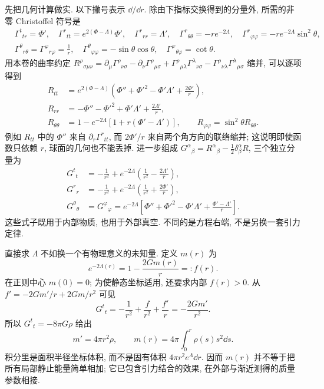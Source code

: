 先把几何计算做实. 以下撇号表示 $\dd/\dd r$. 除由下指标交换得到的分量外, 所需的非零 Christoffel 符号是
\begin{align}
 &\Gamma^t{}_{tr}=\Phi',\quad
 \Gamma^r{}_{tt}=e^{2(\Phi-\Lambda)}\Phi',\quad
 \Gamma^r{}_{rr}=\Lambda',\quad
 \Gamma^r{}_{\theta\theta}=-r e^{-2\Lambda},\quad
 \Gamma^r{}_{\varphi\varphi}=-r e^{-2\Lambda}\sin^2\theta,\nonumber\\
 &\Gamma^\theta{}_{r\theta}=\Gamma^\varphi{}_{r\varphi}=\frac1r,\quad
 \Gamma^\theta{}_{\varphi\varphi}=-\sin\theta\cos\theta,\quad
 \Gamma^\varphi{}_{\theta\varphi}=\cot\theta.
 \label{eq:gr-star-gamma}
\end{align}
用本卷的曲率约定 $R^\rho{}_{\sigma\mu\nu}=\partial_\mu\Gamma^\rho{}_{\nu\sigma}-\partial_\nu\Gamma^\rho{}_{\mu\sigma}+\Gamma^\rho{}_{\mu\lambda}\Gamma^\lambda{}_{\nu\sigma}-\Gamma^\rho{}_{\nu\lambda}\Gamma^\lambda{}_{\mu\sigma}$ 缩并, 可以逐项得到
\begin{align}
 R_{tt}&=e^{2(\Phi-\Lambda)}\left(\Phi''+\Phi'^2-\Phi'\Lambda'+\frac{2\Phi'}r\right),\nonumber\\
 R_{rr}&=-\Phi''-\Phi'^2+\Phi'\Lambda'+\frac{2\Lambda'}r,\nonumber\\
 R_{\theta\theta}&=1-e^{-2\Lambda}\left[1+r(\Phi'-\Lambda')\right],\qquad
 R_{\varphi\varphi}=\sin^2\theta R_{\theta\theta}.
 \label{eq:gr-star-ricci}
\end{align}
例如 $R_{tt}$ 中的 $\Phi''$ 来自 $\partial_r\Gamma^r{}_{tt}$, 而 $2\Phi'/r$ 来自两个角方向的联络缩并; 这说明即使函数只依赖 $r$, 球面的几何也不能丢掉. 进一步组成 $G^\alpha{}_{\beta}=R^\alpha{}_{\beta}-\tfrac12\delta^\alpha_\beta R$, 三个独立分量为
\begin{equation}
\begin{aligned}
 G^t{}_t&=-\frac1{r^2}+e^{-2\Lambda}\left(\frac1{r^2}-\frac{2\Lambda'}r\right),\\
 G^r{}_r&=-\frac1{r^2}+e^{-2\Lambda}\left(\frac1{r^2}+\frac{2\Phi'}r\right),\\
 G^\theta{}_\theta&=G^\varphi{}_\varphi
 =e^{-2\Lambda}\left[\Phi''+\Phi'^2-\Phi'\Lambda'+\frac{\Phi'-\Lambda'}r\right].
\end{aligned}
 \label{eq:gr-star-einstein}
\end{equation}
这些式子既用于内部物质, 也用于外部真空. 不同的是方程右端, 不是另换一套引力定律.


直接求 $\Lambda$ 不如换一个有物理意义的未知量. 定义 $m(r)$ 为
\begin{equation}
 e^{-2\Lambda(r)}=1-\frac{2Gm(r)}r=:f(r).
 \label{eq:gr-mass-function}
\end{equation}
在正则中心 $m(0)=0$; 为使静态坐标适用, 还要求内部 $f(r)>0$. 从 $f'=-2Gm'/r+2Gm/r^2$ 可见
\[
 G^t{}_t=-\frac1{r^2}+\frac f{r^2}+\frac{f'}r
        =-\frac{2Gm'}{r^2}.
\]
所以 $G^t{}_t=-8\pi G\rho$ 给出
\begin{equation}
 m'=4\pi r^2\rho,\qquad m(r)=4\pi\int_0^r\rho(s)s^2\dd s.
 \label{eq:gr-tov-mass}
\end{equation}
积分里是面积半径坐标体积, 而不是固有体积 $4\pi r^2e^\Lambda\dd r$. 因而 $m(r)$ 并不等于把所有局部静止能量简单相加; 它已包含引力结合的效果, 在外部与渐近测得的质量参数相接.

